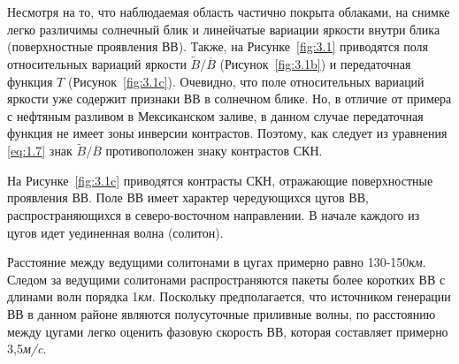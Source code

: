 Несмотря на то, что наблюдаемая область частично покрыта облаками, на снимке легко различимы солнечный блик и линейчатые вариации яркости внутри блика (поверхностные проявления ВВ). Также, на Рисунке~\ref{fig:3.1} приводятся поля относительных вариаций яркости $\widetilde{B}/\overline{B}$ (Рисунок~\ref{fig:3.1b}) и передаточная функция $T$ (Рисунок~\ref{fig:3.1c}). Очевидно, что поле относительных вариаций яркости уже содержит признаки ВВ в солнечном блике. Но, в отличие от примера с нефтяным разливом в Мексиканском заливе, в данном случае передаточная функция не имеет зоны инверсии контрастов. Поэтому, как следует из уравнения \eqref{eq:1.7} знак $\widetilde{B}/\overline{B}$ противоположен знаку контрастов СКН.

На Рисунке~\ref{fig:3.1c} приводятся контрасты СКН, отражающие поверхностные проявления ВВ. Поле ВВ имеет характер чередующихся цугов ВВ, распространяющихся в северо-восточном направлении. В начале каждого из цугов идет уединенная волна (солитон).

Расстояние между ведущими солитонами в цугах примерно равно 130-150\textit{км}. Следом за ведущими солитонами распространяются пакеты более коротких ВВ с длинами волн порядка 1\textit{км}. Поскольку предполагается, что источником генерации ВВ в данном районе являются полусуточные приливные волны, по расстоянию между цугами легко оценить фазовую скорость ВВ, которая составляет примерно 3,5\textit{м/c}.



